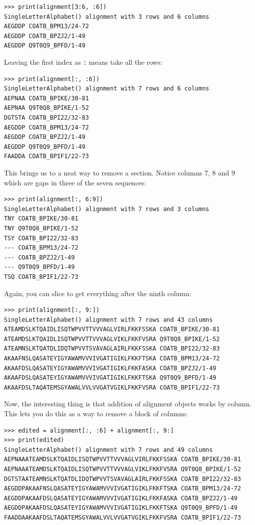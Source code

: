 \documentclass{report}
\begin{document}
\begin{verbatim}
>>> print(alignment[3:6, :6])
SingleLetterAlphabet() alignment with 3 rows and 6 columns
AEGDDP COATB_BPM13/24-72
AEGDDP COATB_BPZJ2/1-49
AEGDDP Q9T0Q9_BPFD/1-49
\end{verbatim}

Leaving the first index as \verb|:| means take all the rows:

\begin{verbatim}
>>> print(alignment[:, :6])
SingleLetterAlphabet() alignment with 7 rows and 6 columns
AEPNAA COATB_BPIKE/30-81
AEPNAA Q9T0Q8_BPIKE/1-52
DGTSTA COATB_BPI22/32-83
AEGDDP COATB_BPM13/24-72
AEGDDP COATB_BPZJ2/1-49
AEGDDP Q9T0Q9_BPFD/1-49
FAADDA COATB_BPIF1/22-73
\end{verbatim}

This brings us to a neat way to remove a section. Notice columns
7, 8 and 9 which are gaps in three of the seven sequences:

\begin{verbatim}
>>> print(alignment[:, 6:9])
SingleLetterAlphabet() alignment with 7 rows and 3 columns
TNY COATB_BPIKE/30-81
TNY Q9T0Q8_BPIKE/1-52
TSY COATB_BPI22/32-83
--- COATB_BPM13/24-72
--- COATB_BPZJ2/1-49
--- Q9T0Q9_BPFD/1-49
TSQ COATB_BPIF1/22-73
\end{verbatim}

\noindent Again, you can slice to get everything after the ninth column:

\begin{verbatim}
>>> print(alignment[:, 9:])
SingleLetterAlphabet() alignment with 7 rows and 43 columns
ATEAMDSLKTQAIDLISQTWPVVTTVVVAGLVIRLFKKFSSKA COATB_BPIKE/30-81
ATEAMDSLKTQAIDLISQTWPVVTTVVVAGLVIKLFKKFVSRA Q9T0Q8_BPIKE/1-52
ATEAMNSLKTQATDLIDQTWPVVTSVAVAGLAIRLFKKFSSKA COATB_BPI22/32-83
AKAAFNSLQASATEYIGYAWAMVVVIVGATIGIKLFKKFTSKA COATB_BPM13/24-72
AKAAFDSLQASATEYIGYAWAMVVVIVGATIGIKLFKKFASKA COATB_BPZJ2/1-49
AKAAFDSLQASATEYIGYAWAMVVVIVGATIGIKLFKKFTSKA Q9T0Q9_BPFD/1-49
AKAAFDSLTAQATEMSGYAWALVVLVVGATVGIKLFKKFVSRA COATB_BPIF1/22-73
\end{verbatim}

\noindent Now, the interesting thing is that addition of alignment objects works
by column. This lets you do this as a way to remove a block of columns:

\begin{verbatim}
>>> edited = alignment[:, :6] + alignment[:, 9:]
>>> print(edited)
SingleLetterAlphabet() alignment with 7 rows and 49 columns
AEPNAAATEAMDSLKTQAIDLISQTWPVVTTVVVAGLVIRLFKKFSSKA COATB_BPIKE/30-81
AEPNAAATEAMDSLKTQAIDLISQTWPVVTTVVVAGLVIKLFKKFVSRA Q9T0Q8_BPIKE/1-52
DGTSTAATEAMNSLKTQATDLIDQTWPVVTSVAVAGLAIRLFKKFSSKA COATB_BPI22/32-83
AEGDDPAKAAFNSLQASATEYIGYAWAMVVVIVGATIGIKLFKKFTSKA COATB_BPM13/24-72
AEGDDPAKAAFDSLQASATEYIGYAWAMVVVIVGATIGIKLFKKFASKA COATB_BPZJ2/1-49
AEGDDPAKAAFDSLQASATEYIGYAWAMVVVIVGATIGIKLFKKFTSKA Q9T0Q9_BPFD/1-49
FAADDAAKAAFDSLTAQATEMSGYAWALVVLVVGATVGIKLFKKFVSRA COATB_BPIF1/22-73
\end{verbatim}
\end{document}
